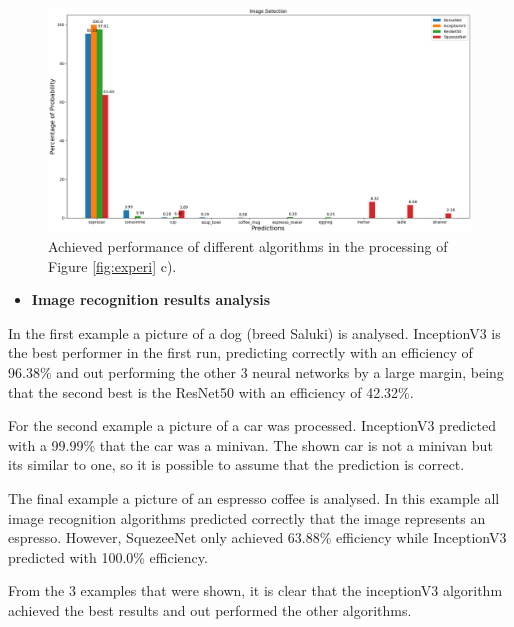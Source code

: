 \begin{figure}[H]
  \centering
  \includegraphics[width=\textwidth]{Sections/4InitialWork/4_images/run4_res.png}
  \caption{Achieved performance of different algorithms in the processing of Figure \ref{fig:experi} c).}
  \label{fig:exp3}
\end{figure}


\newpage


\begin{itemize}
  \item \textbf{Image recognition results analysis}
\end{itemize}





In the first example a picture of a dog (breed Saluki) is analysed. InceptionV3 is the best performer in the first run, predicting correctly with an efficiency of 96.38\% and out performing the other 3 neural networks by a large margin, being that the second best is the ResNet50 with an efficiency of 42.32\%.

For the second example a picture of a car was processed. InceptionV3 predicted with a 99.99\% that the car was a minivan. The shown car is not a minivan but its similar to one, so it is possible to assume that the prediction is correct.

The final example a picture of an espresso coffee is analysed. In this example all image recognition algorithms predicted correctly that the image represents an espresso. However, SquezeeNet only achieved 63.88\% efficiency while InceptionV3 predicted with 100.0\% efficiency.

From the 3 examples that were shown, it is clear that the inceptionV3 algorithm achieved the best results and out performed the other algorithms.






